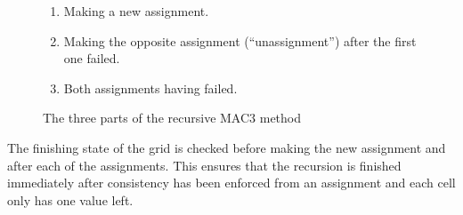 \begin{figure}[H]
    \begin{framed}
        \begin{enumerate}
            \item Making a new assignment.
            \item Making the opposite assignment (``unassignment'') after the first one failed.
            \item Both assignments having failed.
        \end{enumerate}
    \end{framed}
    \caption{The three parts of the recursive MAC3 method}
    \label{fig:mac3Recursion}
\end{figure}

The finishing state of the grid is checked before making the new assignment and after each of the assignments. This ensures that the recursion is finished immediately after consistency has been enforced from an assignment and each cell only has one value left.